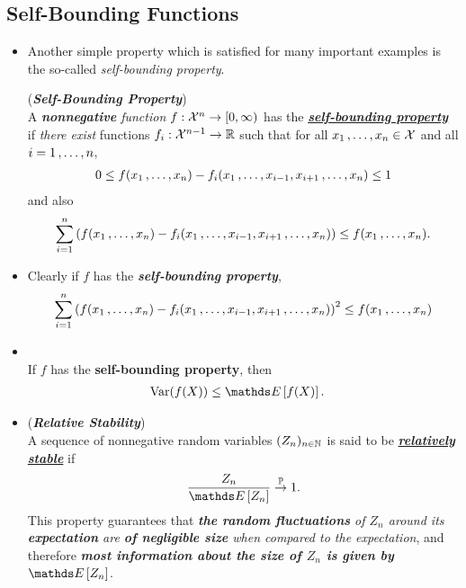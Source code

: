 \documentclass[11pt]{article}
\begin{document}
\subsection{Self-Bounding Functions}
\begin{itemize}
\item Another simple property which is satisfied for many important examples is the so-called \emph{self-bounding property}. 
\begin{definition} (\emph{\textbf{Self-Bounding Property}})\\
A \emph{\textbf{nonnegative} function} $f: {\mathcal X}^n  \to [0, \infty)$ has the \underline{\emph{\textbf{self-bounding property}}} if \emph{there exist} functions $f_i: {\mathcal X}^{n-1} \to {\mathbb R}$ such that for all $x_1 \,{,}\ldots{,}\, x_n \in {\mathcal X}$ and all $i = 1 \,{,}\ldots{,}\, n$,
\begin{align}
0 \le  f(x_1 \,{,}\ldots{,}\, x_n) - f_i(x_1 \,{,}\ldots{,}\, x_{i-1}, x_{i+1} \,{,}\ldots{,}\, x_n) \le 1 \label{eqn: self_bounding_1}
\end{align}
and also
\begin{align}
\sum_{i=1}^{n}\left(f(x_1 \,{,}\ldots{,}\, x_n) - f_i(x_1 \,{,}\ldots{,}\, x_{i-1}, x_{i+1} \,{,}\ldots{,}\, x_n)\right)  \le  f(x_1 \,{,}\ldots{,}\, x_n). \label{eqn: self_bounding_2}
\end{align}
\end{definition}

\item \begin{remark}
Clearly if $f$ has the \textbf{\emph{self-bounding property}}, 
\begin{align}
\sum_{i=1}^{n}\left(f(x_1 \,{,}\ldots{,}\, x_n) - f_i(x_1 \,{,}\ldots{,}\, x_{i-1}, x_{i+1} \,{,}\ldots{,}\, x_n)\right)^2  \le  f(x_1 \,{,}\ldots{,}\, x_n) \label{eqn: self_bounding_3}
\end{align}
\end{remark}

\item \begin{corollary} \citep{boucheron2013concentration}\\
If $f$ has the \textbf{self-bounding property}, then
\begin{align*}
\text{Var}(f(X)) &\le \E{}{f(X)}.
\end{align*}
\end{corollary}

\item \begin{remark} (\emph{\textbf{Relative Stability}}) \citep{boucheron2013concentration}\\
A sequence of nonnegative random variables $(Z_n)_{n\in {\mathbb N}}$ is said to be \underline{\emph{\textbf{relatively stable}}} if 
\begin{align*}
\frac{Z_n}{\E{}{Z_n}} \stackrel{\bP}{\rightarrow} 1.
\end{align*}
This property guarantees that \emph{\textbf{the random fluctuations} of $Z_n$ around its \textbf{expectation} are \textbf{of negligible size} when compared to the expectation}, and therefore \emph{\textbf{most information about the size of $Z_n$ is given by $\E{}{Z_n}$}}. 


\end{remark}
\end{itemize}
\end{document}
